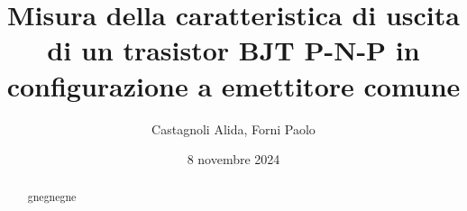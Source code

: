 \documentclass[11pt]{article}
\begin{document}

    \title{\textbf{
        Misura della caratteristica di uscita di un trasistor BJT P-N-P in configurazione
        a emettitore comune
    }}
    \author{Castagnoli Alida, Forni Paolo}
    \date{8 novembre 2024}
    \maketitle


    \vspace{-23pt}  %

    \begin{abstract}


        gnegnegne

    \end{abstract}
    
    
    
    
    \newpage

    \appendix
    
\end{document}
